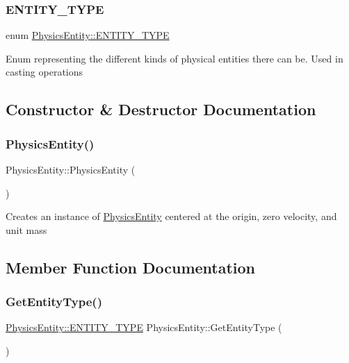 \subsubsection{\texorpdfstring{E\+N\+T\+I\+T\+Y\+\_\+\+T\+Y\+PE}{ENTITY\_TYPE}}
{\footnotesize\ttfamily enum \hyperlink{classPhysicsEntity_a171840d3fef1fc21c3f922b240e03538}{Physics\+Entity\+::\+E\+N\+T\+I\+T\+Y\+\_\+\+T\+Y\+PE}\hspace{0.3cm}{\ttfamily [strong]}}

Enum representing the different kinds of physical entities there can be. Used in casting operations 

\subsection{Constructor \& Destructor Documentation}
\mbox{\label{classPhysicsEntity_a2c0cf9804f1864105849586bc91e8dea}} 
\subsubsection{\texorpdfstring{Physics\+Entity()}{PhysicsEntity()}}
{\footnotesize\ttfamily Physics\+Entity\+::\+Physics\+Entity (\begin{DoxyParamCaption}{ }\end{DoxyParamCaption})\hspace{0.3cm}{\ttfamily [protected]}}

Creates an instance of \hyperlink{classPhysicsEntity}{Physics\+Entity} centered at the origin, zero velocity, and unit mass 

\subsection{Member Function Documentation}
\mbox{\label{classPhysicsEntity_a5a1eb68e1ecb2d845959addbbc915577}} 
\subsubsection{\texorpdfstring{Get\+Entity\+Type()}{GetEntityType()}}
{\footnotesize\ttfamily \hyperlink{classPhysicsEntity_a171840d3fef1fc21c3f922b240e03538}{Physics\+Entity\+::\+E\+N\+T\+I\+T\+Y\+\_\+\+T\+Y\+PE} Physics\+Entity\+::\+Get\+Entity\+Type (\begin{DoxyParamCaption}{ }\end{DoxyParamCaption})}

